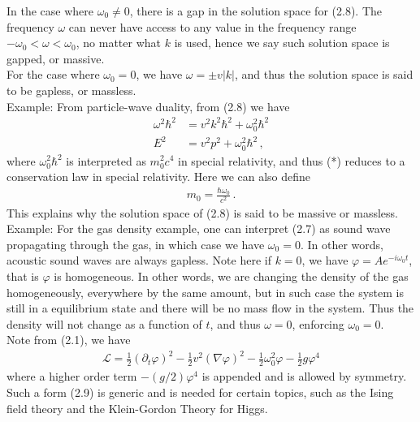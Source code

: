 \documentclass[11pt, onesided]{book}
\theoremstyle{break}
\theoremstyle{break}
\newcommand{\pd}{\partial}
\newcommand{\example}{\color{green}Example: \color{black}}
\begin{document}
In the case where $\omega_0 \neq 0$, there is a gap in the solution space for (2.8). The frequency $\omega$ can never have access to any value in the frequency range $-\omega_0 < \omega <\omega_0$, no matter what $k$ is used, hence we say such solution space is gapped, or massive.\\

For the case where $\omega_0 = 0$, we have $\omega = \pm v|k|$, and thus the solution space is said to be gapless, or massless.\\

\example 
From particle-wave duality, from (2.8) we have
\begin{align*}
\omega^2 \hbar^2 &= v^2 k^2 \hbar^2 + \omega_0^2 \hbar^2\\
E^2 &= v^2 p^2 + \omega_0^2 \hbar^2\,, \tag{*}
\end{align*}
where $\omega_0^2 \hbar^2$ is interpreted as $m_0^2 c^4$ in special relativity, and thus (*) reduces to a conservation law in special relativity. Here we can also define
\begin{align*}
m_0 = \frac{\hbar \omega_0}{c^2}\,.
\end{align*}
This explains why the solution space of (2.8) is said to be massive or massless. \\

\example For the gas density example, one can interpret (2.7) as sound wave propagating through the gas, in which case we have $\omega_0 = 0$. In other words, acoustic sound waves are always gapless. Note here if $k= 0$, we have $\varphi = Ae^{-i\omega_0t}$, that is $\varphi$ is homogeneous. In other words, we are changing the density of the gas homogeneously, everywhere by the same amount, but in such case the system is still in a equilibrium state and there will be no mass flow in the system. Thus the density will not change as a function of $t$, and thus $\omega = 0$, enforcing $\omega_0=0$.\\

Note from (2.1), we have
\begin{align}
\mathcal{L} = \frac{1}{2}\left( \pd_t \varphi\right)^2 - \frac{1}{2}v^2 \left(\nabla \varphi\right)^2 - \frac{1}{2} \omega_0^2 \varphi - \frac{1}{2}g\varphi^4
\end{align}
where a higher order term $-(g/2)\varphi^4$ is appended and is allowed by symmetry. Such a form (2.9) is generic and is needed for certain topics, such as the Ising field theory and the Klein-Gordon Theory for Higgs.\\ 
\end{document}
